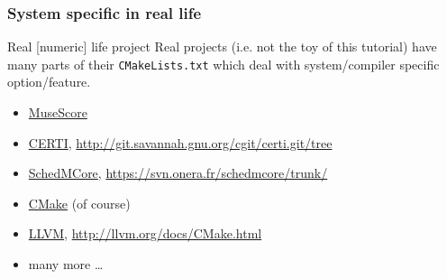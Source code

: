 \documentclass[compress,slidestop,table,usepdftitle=false
              ]
               {beamer}
\newcommand{\fname}[1]{\texttt{#1}}
\begin{document}
\begin{frame}[fragile]
\frametitle{System specific in real life}
\begin{block}{Real [numeric] life project}
Real projects (i.e. not the toy of this tutorial) have many parts
of their \fname{CMakeLists.txt} which deal with system/compiler
specific option/feature.
\end{block}
\begin{itemize}
\item \href{http://musescore.org}{MuseScore}
\item \href{https://savannah.nongnu.org/projects/certi/}{CERTI},
{\scriptsize \url{http://git.savannah.gnu.org/cgit/certi.git/tree}}
\item \href{https://forge.onera.fr/projects/schedmcore}{SchedMCore},
{\scriptsize \url{https://svn.onera.fr/schedmcore/trunk/}}
\item \href{http://cmake.org}{CMake} (of course)
\item \href{http://llvm.org}{LLVM}, {\scriptsize \url{http://llvm.org/docs/CMake.html}}
\item many more \ldots
\end{itemize}
\end{frame}
\end{document}
